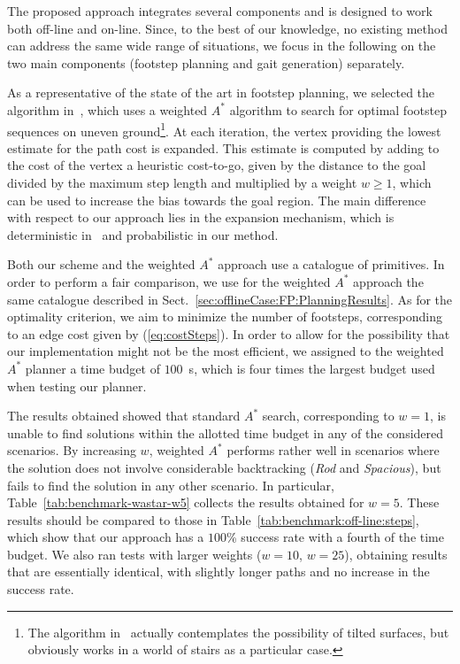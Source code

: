 The proposed approach integrates several components and is designed to work both off-line and on-line. 
Since, to the best of our knowledge, no existing method can address the same wide range of situations, we focus in the following on the two main components (footstep planning and gait generation) separately.


As a representative of the state of the art in footstep planning, we selected the algorithm in~\cite{Griffin_ICRA2019}, which uses a weighted $A^\ast$ algorithm to search for optimal footstep sequences on uneven ground\footnote{The algorithm in~\cite{Griffin_ICRA2019} actually contemplates the possibility of tilted surfaces, but obviously works in a world of stairs as a particular case.}. At each iteration, the vertex providing the lowest estimate for the path cost is expanded. This estimate is computed by adding to the cost of the vertex a heuristic cost-to-go, given by the distance to the goal divided by the maximum step length and multiplied by a weight $w\ge 1$, which can be used to increase the bias towards the goal region. The main difference with respect to our approach lies in the expansion mechanism, which is deterministic in~\cite{Griffin_ICRA2019} and probabilistic in our method. 


Both our scheme and the weighted $A^\ast$ approach use a catalogue of primitives. In order to perform a fair comparison, we use for the weighted $A^\ast$ approach the same catalogue described in Sect.~\ref{sec:offlineCase:FP:PlanningResults}. As for the optimality criterion, we aim to minimize the number of footsteps, corresponding to an edge cost given by (\ref{eq:costSteps}). In order to allow for the possibility that our implementation might not be the most efficient, we assigned to the weighted $A^\ast$ planner a time budget of $100$~s, which is four times the largest budget used when testing our planner. 

The results obtained showed that standard $A^\ast$ search, corresponding to $w=1$, is unable to find solutions within the allotted time budget in any of the considered scenarios. 
By increasing $w$, weighted $A^\ast$ performs rather well in scenarios where the solution does not involve considerable backtracking ({\em Rod} and {\em Spacious}), but fails to find the solution in any other scenario. In particular, Table~\ref{tab:benchmark-wastar-w5} collects the results obtained for $w=5$. 
These results should be compared to those in Table~\ref{tab:benchmark:off-line:steps}, which show that our approach has a $100$\% success rate with a fourth of the time budget. 
We also ran tests with larger weights ($w=10$, $w=25$), obtaining results that are essentially identical, with slightly longer paths and no increase in the success rate. 


